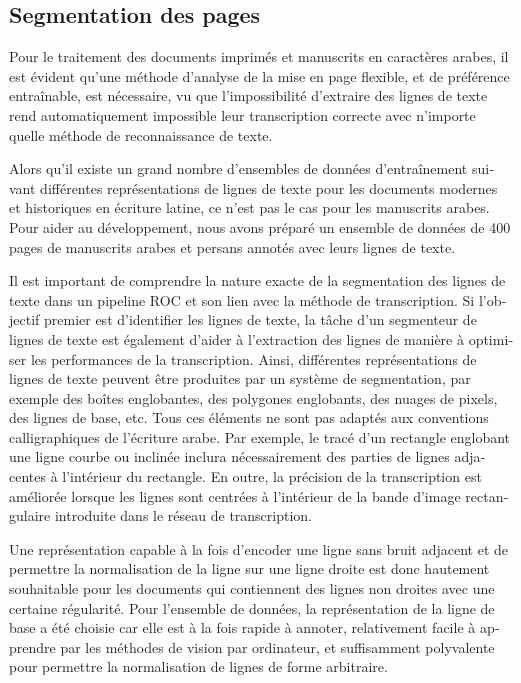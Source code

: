 \begin{french}
\section{Segmentation des pages}

Pour le traitement des documents imprimés et manuscrits en caractères arabes,
il est évident qu'une méthode d'analyse de la mise en page flexible, et de
préférence entraînable, est nécessaire, vu que l'impossibilité d'extraire des
lignes de texte rend automatiquement impossible leur transcription correcte
avec n'importe quelle méthode de reconnaissance de texte.

Alors qu'il existe un grand nombre d'ensembles de données d'entraînement
suivant différentes représentations de lignes de texte pour les documents
modernes et historiques en écriture latine, ce n'est pas le cas pour les
manuscrits arabes. Pour aider au développement, nous avons préparé un ensemble
de données de 400 pages de manuscrits arabes et persans annotés avec leurs
lignes de texte.

Il est important de comprendre la nature exacte de la segmentation des lignes
de texte dans un pipeline ROC et son lien avec la méthode de transcription. Si
l'objectif premier est d'identifier les lignes de texte, la tâche d'un
segmenteur de lignes de texte est également d'aider à l'extraction des lignes
de manière à optimiser les performances de la transcription. Ainsi, différentes
représentations de lignes de texte peuvent être produites par un système de
segmentation, par exemple des boîtes englobantes, des polygones englobants, des
nuages de pixels, des lignes de base, etc. Tous ces éléments ne sont pas
adaptés aux conventions calligraphiques de l'écriture arabe. Par exemple, le
tracé d'un rectangle englobant une ligne courbe ou inclinée inclura
nécessairement des parties de lignes adjacentes à l'intérieur du rectangle.  En
outre, la précision de la transcription est améliorée lorsque les lignes sont
centrées à l'intérieur de la bande d'image rectangulaire introduite dans le
réseau de transcription.

Une représentation capable à la fois d'encoder une ligne sans bruit adjacent et
de permettre la normalisation de la ligne sur une ligne droite est donc
hautement souhaitable pour les documents qui contiennent des lignes non droites
avec une certaine régularité.  Pour l'ensemble de données, la représentation de
la ligne de base a été choisie car elle est à la fois rapide à annoter,
relativement facile à apprendre par les méthodes de vision par ordinateur, et
suffisamment polyvalente pour permettre la normalisation de lignes de forme
arbitraire.


\end{french}
